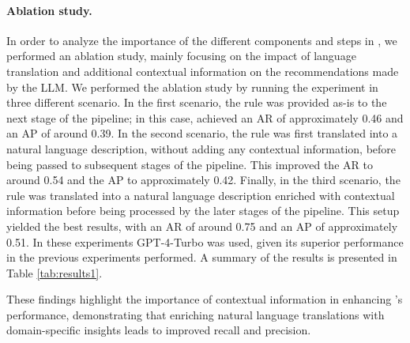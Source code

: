 \paragraph{\textbf{Ablation study.}}
In order to analyze the importance of the different components and steps in \methodName, we performed an ablation study, mainly focusing on the impact of language translation and additional contextual information on the recommendations made by the LLM.
We performed the ablation study by running the experiment in three different scenario.
In the first scenario, the rule was provided as-is to the next stage of the pipeline; in this case, \methodName achieved an AR of approximately 0.46 and an AP of around 0.39.
In the second scenario, the rule was first translated into a natural language description, without adding any contextual information, before being passed to subsequent stages of the pipeline. 
This improved the AR to around 0.54 and the AP to approximately 0.42.
Finally, in the third scenario, the rule was translated into a natural language description enriched with contextual information before being processed by the later stages of the pipeline. 
This setup yielded the best results, with an AR of around 0.75 and an AP of approximately 0.51.
In these experiments GPT-4-Turbo was used, given its superior performance in the previous experiments performed.
A summary of the results is presented in Table \ref{tab:results1}.



These findings highlight the importance of contextual information in enhancing \methodName's performance, demonstrating that enriching natural language translations with domain-specific insights leads to improved recall and precision.

